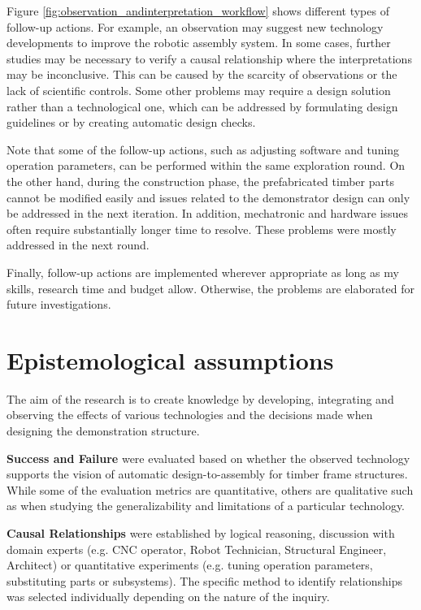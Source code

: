 Figure \ref{fig:observation_andinterpretation_workflow} shows different types of follow-up actions. For example, an observation may suggest new technology developments to improve the robotic assembly system. In some cases, further studies may be necessary to verify a causal relationship where the interpretations may be inconclusive. This can be caused by the scarcity of observations or the lack of scientific controls. Some other problems may require a design solution rather than a technological one, which can be addressed by formulating design guidelines or by creating automatic design checks. 

Note that some of the follow-up actions, such as adjusting software and tuning operation parameters, can be performed within the same exploration round. On the other hand, during the construction phase, the prefabricated timber parts cannot be modified easily and issues related to the demonstrator design can only be addressed in the next iteration. In addition, mechatronic and hardware issues often require substantially longer time to resolve. These problems were mostly addressed in the next round. 

Finally, follow-up actions are implemented wherever appropriate as long as my skills, research time and budget allow. Otherwise, the problems are elaborated for future investigations. 

\section{Epistemological assumptions}
\label{section:methodology-epistemological-assumptions}

The aim of the research is to create knowledge by developing, integrating and observing the effects of various technologies and the decisions made when designing the demonstration structure.

\textbf{Success and Failure} were evaluated based on whether the observed technology supports the vision of automatic design-to-assembly for timber frame structures. While some of the evaluation metrics are quantitative, others are qualitative such as when studying the generalizability and limitations of a particular technology.

\textbf{Causal Relationships} were established by logical reasoning, discussion with domain experts (e.g. CNC operator, Robot Technician, Structural Engineer, Architect) or quantitative experiments (e.g. tuning operation parameters, substituting parts or subsystems). The specific method to identify relationships was selected individually depending on the nature of the inquiry.

